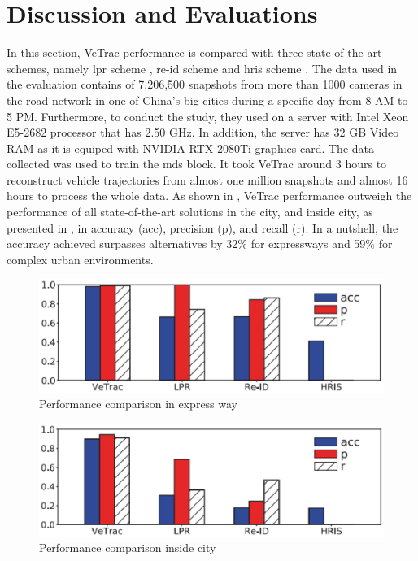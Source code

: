 \section{Discussion and Evaluations}  \label{sec:discussion_evaluations}

In this section, VeTrac performance is compared with three state of the art schemes, namely \ac{lpr} scheme \cite{simonyan2014very}, \ac{re-id} scheme \cite{liu2017provid} and \ac{hris} scheme \cite{zheng2012reducing}.
The data used in the evaluation contains of 7,206,500 snapshots from more than 1000 cameras in the road network in one of China's big cities during a specific day from 8 AM to 5 PM.
Furthermore, to conduct the study, they used on a server with Intel Xeon E5-2682 processor that has 2.50 GHz.
In addition, the server has 32 GB Video RAM as it is equiped with NVIDIA RTX 2080Ti graphics card.
The data collected was used to train the \ac{mds} block.
It took VeTrac around 3 hours to reconstruct vehicle trajectories from almost one million snapshots and almost 16 hours to process the whole data.
As shown in , VeTrac performance outweigh the performance of all state-of-the-art solutions in the city, and inside city, as presented in , in accuracy (acc), precision (p), and recall (r).
In a nutshell, the accuracy achieved surpasses alternatives by 32\%
for expressways and 59\% for complex urban environments.

\begin{figure}
\centering
  \includegraphics[width=0.9\linewidth]{figures/performance-comparison.eps}
  \caption{Performance comparison in express way \cite{tong2021large}}
  \label{fig:performance-comparison}
\end{figure}

\begin{figure}
\centering
  \includegraphics[width=0.9\linewidth]{figures/performance-comparison-urban.eps}
  \caption{Performance comparison inside city \cite{tong2021large}}
  \label{fig:performance-comparison-city}
\end{figure}

